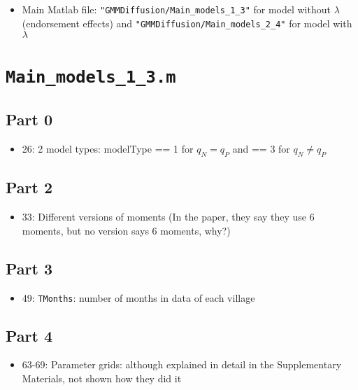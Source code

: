 \documentclass[10pt,letterpaper]{article}
\author{Mizuhiro Suzuki}
\title{}
\begin{document}
\maketitle

\tableofcontents

\section{}

\begin{itemize}
  \item Main Matlab file: \texttt{"GMMDiffusion/Main\_models\_1\_3"} for model without $\lambda$ (endorsement effects) and \texttt{"GMMDiffusion/Main\_models\_2\_4"} for model with $\lambda$
\end{itemize}

\section{\texttt{Main\_models\_1\_3.m}}\label{main_models_1_3}

\subsection*{Part 0}
\begin{itemize}
  \item 26: 2 model types: modelType == 1 for $q_N = q_P$ and == 3 for $q_N \ne q_P$
\end{itemize}

\subsection*{Part 2}
\begin{itemize}
  \item 33: Different versions of moments
    (In the paper, they say they use 6 moments, but no version says 6 moments, why?)
\end{itemize}

\subsection*{Part 3}
\begin{itemize}
  \item 49: \texttt{TMonths}: number of months in data of each village
\end{itemize}

\subsection*{Part 4}
\begin{itemize}
  \item 63-69: Parameter grids: although explained in detail in the Supplementary Materials, not shown how they did it
\end{itemize}
\end{document}
